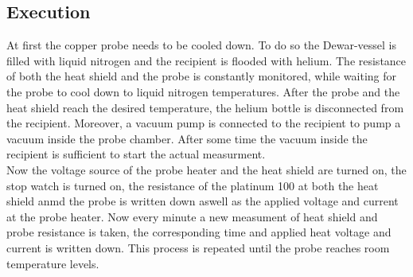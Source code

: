 \subsection{Execution}
At first the copper probe needs to be cooled down.
To do so the Dewar-vessel is filled with liquid nitrogen and the recipient is flooded with helium.
The resistance of both the heat shield and the probe is constantly monitored, while waiting for the probe to cool down to liquid nitrogen temperatures.
After the probe and the heat shield reach the desired temperature, the helium bottle is disconnected from the recipient.
Moreover, a vacuum pump is connected to the recipient to pump a vacuum inside the probe chamber.
After some time the vacuum inside the recipient is sufficient to start the actual measurment. \\
Now the voltage source of the probe heater and the heat shield are turned on, the stop watch is turned on, the resistance of the platinum 100 at both the heat shield anmd the probe is written down aswell as the applied voltage and current at the probe heater.
Now every minute a new measument of heat shield and probe resistance is taken, the corresponding time and applied heat voltage and current is written down.
This process is repeated until the probe reaches room temperature levels.